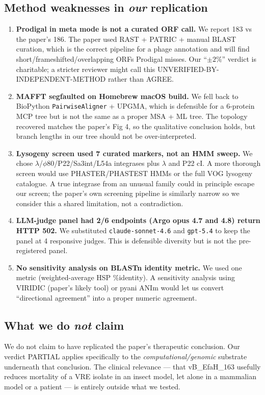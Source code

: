\documentclass[11pt,letterpaper]{article}
\begin{document}
\subsection*{Method weaknesses in \emph{our} replication}
\begin{enumerate}[leftmargin=1.4cm]
  \item \textbf{Prodigal in meta mode is not a curated ORF call.} We report 183 vs the paper's 186. The paper used RAST + PATRIC + manual BLAST curation, which is the correct pipeline for a phage annotation and will find short/frameshifted/overlapping ORFs Prodigal misses. Our ``$\pm 2\%$'' verdict is charitable; a stricter reviewer might call this UNVERIFIED-BY-INDEPENDENT-METHOD rather than AGREE.
  \item \textbf{MAFFT segfaulted on Homebrew macOS build.} We fell back to BioPython \texttt{PairwiseAligner} + UPGMA, which is defensible for a 6-protein MCP tree but is not the same as a proper MSA + ML tree. The topology recovered matches the paper's Fig 4, so the qualitative conclusion holds, but branch lengths in our tree should not be over-interpreted.
  \item \textbf{Lysogeny screen used 7 curated markers, not an HMM sweep.} We chose $\lambda$/$\phi 80$/P22/Sa3int/L54a integrases plus $\lambda$ and P22 cI. A more thorough screen would use PHASTER/PHASTEST HMMs or the full VOG lysogeny catalogue. A true integrase from an unusual family could in principle escape our screen; the paper's own screening pipeline is similarly narrow so we consider this a shared limitation, not a contradiction.
  \item \textbf{LLM-judge panel had 2/6 endpoints (Argo opus 4.7 and 4.8) return HTTP 502.} We substituted \texttt{claude-sonnet-4.6} and \texttt{gpt-5.4} to keep the panel at 4 responsive judges. This is defensible diversity but is not the pre-registered panel.
  \item \textbf{No sensitivity analysis on BLASTn identity metric.} We used one metric (weighted-average HSP \%identity). A sensitivity analysis using VIRIDIC (paper's likely tool) or pyani ANIm would let us convert ``directional agreement'' into a proper numeric agreement.
\end{enumerate}

\subsection*{What we do \emph{not} claim}
We do not claim to have replicated the paper's therapeutic conclusion. Our verdict PARTIAL applies specifically to the \emph{computational/genomic} substrate underneath that conclusion. The clinical relevance --- that vB\_EfaH\_163 usefully reduces mortality of a VRE isolate in an insect model, let alone in a mammalian model or a patient --- is entirely outside what we tested.
\end{document}

